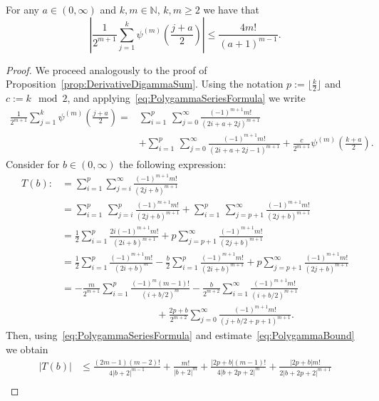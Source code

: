 \documentclass[10pt]{amsart}
\theoremstyle{definition}\newtheorem{defi}[theo]{Definition}\newtheorem{rema}[theo]{Remark}\newtheorem{exam}[theo]{Example}\newtheorem{exem}[theo]{Example}\newtheorem{nota}[theo]{Notation}
\newcommand{\N}{\mathbb{N}}
\begin{document}
\begin{prop}\label{prop:DerivativeDigammaSumBound}
For any $a\in(0,\infty)$ and $k,m\in\N$, $k,m\ge 2$ we have that
\[
\left|\frac{1}{2^{m+1}}\sum\limits_{j=1}^k\psi^{(m)}\left(\frac{j+a}{2}\right)\right|\leq\frac{4m!}{(a+1)^{m-1}}.
\]
\end{prop}

\begin{proof}
We proceed analogously to the proof of Proposition~\ref{prop:DerivativeDigammaSum}. Using the notation $p:=\lfloor\frac{k}{2}\rfloor$ and $c:= k\mod 2$, and applying~\eqref{eq:PolygammaSeriesFormula} we write
\begin{align*}
\frac{1}{2^{m+1}}\sum\limits_{j=1}^k\psi^{(m)}\left(\frac{j+a}{2}\right)=&\sum\limits_{i=1}^p\,\sum\limits_{j=0}^{\infty}\frac{(-1)^{m+1}m!}{(2i+a+2j)^{m+1}}\\
&+\sum\limits_{i=1}^p\,\sum\limits_{j=0}^{\infty}\frac{(-1)^{m+1}m!}{(2i+a+2j-1)^{m+1}}+\frac{c}{2^{m+1}}\psi^{(m)}\left(\frac{k+a}{2}\right).
\end{align*}
Consider for $b\in(0,\infty)$ the following expression:
\begin{align*}
T(b):&=\sum\limits_{i=1}^p\sum\limits_{j=i}^{\infty}\frac{(-1)^{m+1}m!}{(2j+b)^{m+1}}\\
&=\sum\limits_{i=1}^p\,\sum\limits_{j=i}^{p}\frac{(-1)^{m+1}m!}{(2j+b)^{m+1}}+\sum\limits_{i=1}^p\,\sum\limits_{j=p+1}^{\infty}\frac{(-1)^{m+1}m!}{(2j+b)^{m+1}}\\
&=\frac12\sum\limits_{i=1}^p\frac{2i(-1)^{m+1}m!}{(2i+b)^{m+1}}+p\sum\limits_{j=p+1}^{\infty}\frac{(-1)^{m+1}m!}{(2j+b)^{m+1}}\\
&=\frac12\sum\limits_{i=1}^p\frac{(-1)^{m+1}m!}{(2i+b)^{m}}-\frac{b}{2}\sum\limits_{i=1}^p\frac{(-1)^{m+1}m!}{(2i+b)^{m+1}}+p\sum\limits_{j=p+1}^{\infty}\frac{(-1)^{m+1}m!}{(2j+b)^{m+1}}\\
&=-\frac{m}{2^{m+1}}\sum\limits_{i=1}^p\frac{(-1)^{m}(m-1)!}{(i+b/2)^m}-\frac{b}{2^{m+2}}\sum\limits_{i=1}^\infty\frac{(-1)^{m+1}m!}{(i+b/2)^{m+1}}\\
&\hspace{4cm}+\frac{2p+b}{2^{m+2}}\sum\limits_{j=0}^{\infty}\frac{(-1)^{m+1}m!}{(j+b/2+p+1)^{m+1}}.
\end{align*}
Then, using~\eqref{eq:PolygammaSeriesFormula} and estimate~\eqref{eq:PolygammaBound} we obtain
\begin{align*}
\left|T(b)\right|&\leq\frac{(2m-1)(m-2)!}{4|b+2|^{m-1}}+\frac{m!}{|b+2|^{m}}+\frac{|2p+b|(m-1)!}{4|b+2p+2|^{m}}+\frac{|2p+b|m!}{2|b+2p+2|^{m+1}}\\

\end{align*}
\end{proof}
\end{document}
